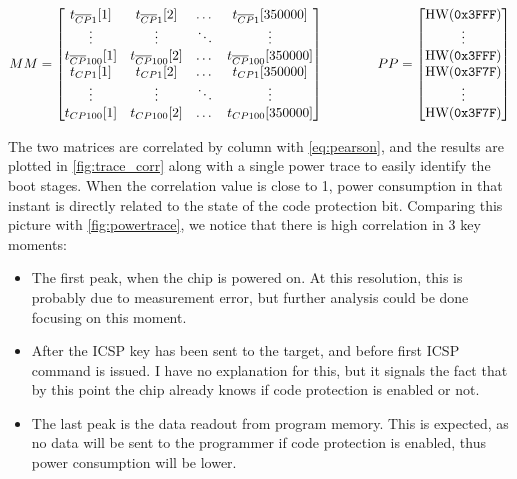 \documentclass[a4paper,english,twoside,10pt]{article}
\begin{document}
\[
MM = 
\begin{bmatrix}
	t_{\overline{\footnotesize CP}1}[1] & t_{\overline{\footnotesize CP}1}[2] & \dots & t_{\overline{\footnotesize CP}1}[350000] \\
	\vdots & \vdots & \ddots & \vdots \\
	t_{\overline{\footnotesize CP}100}[1] & t_{\overline{\footnotesize CP}100}[2] & \dots & t_{\overline{\footnotesize CP}100}[350000] \\
	t_{\footnotesize CP1}[1] & t_{\footnotesize CP1}[2] & \dots & t_{\footnotesize CP1}[350000] \\
	\vdots & \vdots & \ddots & \vdots \\
	t_{\footnotesize CP100}[1] & t_{\footnotesize CP100}[2] & \dots & t_{\footnotesize CP100}[350000]
\end{bmatrix}
\qquad \qquad
PP =
\begin{bmatrix}
	\text{HW}(\mbox{\texttt{0x3FFF}}) \\
	\vdots \\
	\text{HW}(\mbox{\texttt{0x3FFF}}) \\
	\text{HW}(\mbox{\texttt{0x3F7F}}) \\
	\vdots \\
	\text{HW}(\mbox{\texttt{0x3F7F}})
\end{bmatrix}
\]

The two matrices are correlated by column with \cref{eq:pearson}, and the results are plotted in \cref{fig:trace_corr} along with a single power trace to easily identify the boot stages. When the correlation value is close to 1, power consumption in that instant is directly related to the state of the code protection bit. Comparing this picture with \cref{fig:powertrace}, we notice that there is high correlation in 3 key moments:
\begin{itemize}
	\item The first peak, when the chip is powered on. At this resolution, this is probably due to measurement error, but further analysis could be done focusing on this moment.
	\item After the ICSP key has been sent to the target, and before first ICSP command is issued. I have no explanation for this, but it signals the fact that by this point the chip already knows if code protection is enabled or not.
	\item The last peak is the data readout from program memory. This is expected, as no data will be sent to the programmer if code protection is enabled, thus power consumption will be lower.
\end{itemize}
\end{document}

